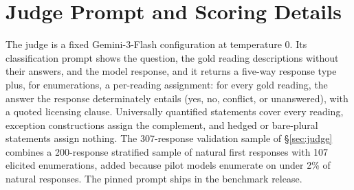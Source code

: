 \section{Judge Prompt and Scoring Details}
\label{app:judge}

\begin{table}[h]
\centering
\small
\setlength{\tabcolsep}{4.5pt}
\caption{Validation of the evaluation suite on 307 responses: a stratified 200-response sample of natural first responses plus 107 elicited enumerations, added because natural first responses rarely enumerate. Cells report each row's metric: Cohen's $\kappa$ for binary labels, exact agreement and Pearson $r$ (\% / $r$) for the per-reading assignments. \textbf{Re-run}: agreement of the same judge across repeated runs. \textbf{Cross}: agreement with GPT-4o as a second-family judge. \textbf{Human}: agreement with human annotators from a single annotation session with a 30-example adjudicated error audit (Appendix~B).}
\label{tab:validation}
\end{table}

The judge is a fixed Gemini-3-Flash configuration at temperature 0. Its classification prompt shows the question, the gold reading descriptions without their answers, and the model response, and it returns a five-way response type plus, for enumerations, a per-reading assignment: for every gold reading, the answer the response determinately entails (yes, no, conflict, or unanswered), with a quoted licensing clause. Universally quantified statements cover every reading, exception constructions assign the complement, and hedged or bare-plural statements assign nothing. The 307-response validation sample of \S\ref{sec:judge} combines a 200-response stratified sample of natural first responses with 107 elicited enumerations, added because pilot models enumerate on under 2\% of natural responses. The pinned prompt ships in the benchmark release.
